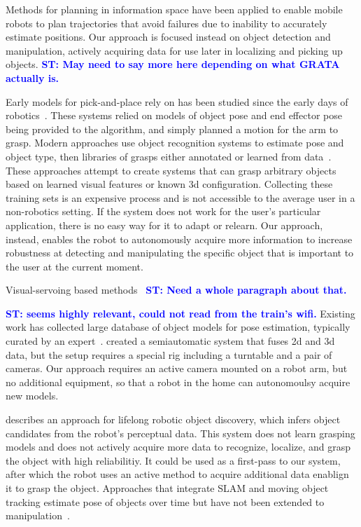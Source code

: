 \documentclass[conference]{IEEEtran}
\newcommand{\stnote}[1]{\textcolor{Blue}{\textbf{ST: #1}}}
\begin{document}
Methods for planning in information space \citep{he08, atanasov13,
  prentice09} have been applied to enable mobile robots to plan
trajectories that avoid failures due to inability to accurately
estimate positions.  Our approach is focused instead on
object detection and manipulation, actively acquiring data for use
later in localizing and picking up objects. \stnote{May need to say
  more here depending on what GRATA actually is.}


Early models for pick-and-place rely on has been studied since the
early days of robotics~\citep{brooks83, lozano89}.  These systems
relied on models of object pose and end effector pose being provided to the
algorithm, and simply planned a motion for the arm to grasp.  Modern
approaches use object recognition systems to estimate pose and object
type, then libraries of grasps either annotated or learned from
data~\citep{saxena08, goldfeder09, morales03}.  These approaches
attempt to create systems that can grasp arbitrary objects based on
learned visual features or known 3d configuration.  Collecting these
training sets is an expensive process and is not accessible to the
average user in a non-robotics setting.  If the system does not work
for the user's particular application, there is no easy way for it to
adapt or relearn.  Our approach, instead, enables the robot to
autonomously acquire more information to increase robustness at
detecting and manipulating the specific object that is important to
the user at the current moment.

Visual-servoing based methods~\citep{chaumette06} \stnote{Need a whole
  paragraph about that. }

\stnote{\citet{ciocarlie14} seems highly relevant, could not read from
  the train's wifi.}  Existing work has collected large database of
object models for pose estimation, typically curated by an
expert~\citep{lai11}.  \citet{kasper12} created a semiautomatic system
that fuses 2d and 3d data, but the setup requires a special rig
including a turntable and a pair of cameras.  Our approach requires an
active camera mounted on a robot arm, but no additional equipment, so
that a robot in the home can autonomoulsy acquire new models.

\citet{collect14} describes an approach for lifelong robotic object
discovery, which infers object candidates from the robot's perceptual
data.  This system does not learn grasping models and does not
actively acquire more data to recognize, localize, and grasp the
object with high reliabilitiy.  It could be used as a first-pass to
our system, after which the robot uses an active method to acquire
additional data enablign it to grasp the object.  Approaches that
integrate SLAM and moving object tracking estimate pose of objects
over time but have not been extended to manipulation~\citep{wang07,
  gallagher09, salas-moreno13, selvatici08}.
\end{document}
